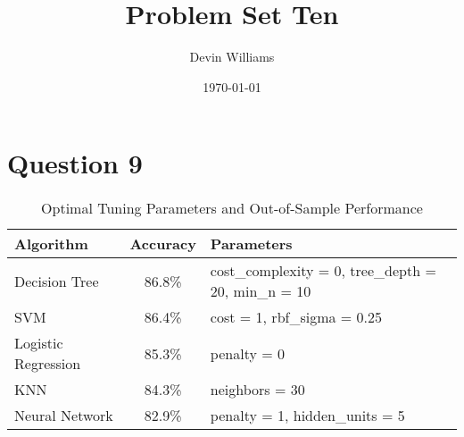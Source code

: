 \documentclass[12pt,letterpaper]{article}
\title{\textbf{Problem Set Ten}}
\author{Devin Williams}
\date{\today}
\begin{document}
\maketitle

\section{Question 9}
 \begin{table}[htbp]
    \centering
    \caption{Optimal Tuning Parameters and Out-of-Sample Performance}
    \begin{tabular}{lcp{8cm}}
    \hline
    Algorithm & Accuracy & Parameters \\
    \hline
    Decision Tree & 86.8\% & cost\_complexity = 0, tree\_depth = 20, min\_n = 10 \\
    SVM & 86.4\% & cost = 1, rbf\_sigma = 0.25 \\
    Logistic Regression & 85.3\% & penalty = 0 \\
    KNN & 84.3\% & neighbors = 30 \\
    Neural Network & 82.9\% & penalty = 1, hidden\_units = 5 \\
    \hline
    \end{tabular}
\end{table}
\end{document}
